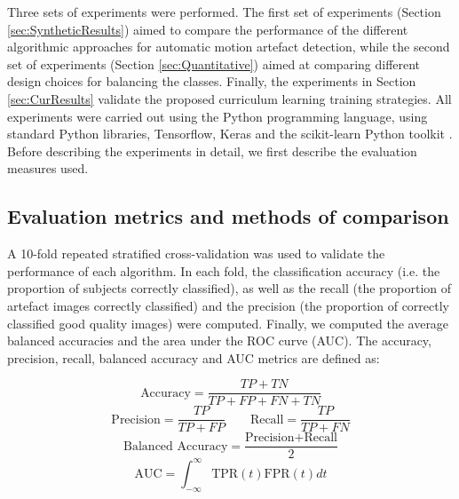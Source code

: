 \documentclass[preprint,12pt,authoryear]{elsarticle}
\begin{document}
Three sets of experiments were performed. The first set of experiments (Section \ref{sec:SyntheticResults}) aimed to compare the performance of the different algorithmic approaches for automatic motion artefact detection, while the second set of experiments (Section \ref{sec:Quantitative}) aimed at comparing different design choices for balancing the classes. Finally, the experiments in Section \ref{sec:CurResults} validate the proposed curriculum learning training strategies.
All experiments were carried out using the Python programming language, using standard Python libraries, Tensorflow, Keras and the scikit-learn Python toolkit \citep{Pedregosa2011}.
Before describing the experiments in detail, we first describe the evaluation measures used.\\


\subsection{Evaluation metrics and methods of comparison}
\label{sec:error_measures}
A 10-fold repeated stratified cross-validation was used to validate the performance of each algorithm. In each fold, the classification accuracy (i.e. the proportion of subjects correctly classified), as well as the recall (the proportion of artefact images correctly classified) and the precision (the proportion of correctly classified good quality images) were computed. Finally, we computed the average balanced accuracies and the area under the ROC curve (AUC).
The accuracy, precision, recall, balanced accuracy and AUC metrics are defined as:
 
$$\text{Accuracy}= \dfrac{TP+TN}{TP+FP+FN+TN}$$
$$\text{Precision}= \dfrac{TP}{TP+FP} \quad  \quad  \text{Recall}= \dfrac{TP}{TP+FN}$$
$$\text{Balanced Accuracy}= \dfrac{\text{Precision+Recall}}{2}$$ 
$$\text{AUC}= \int_{-\infty }^{\infty } \text{TPR}(t) \text{FPR}(t) dt$$ \\
\end{document}
